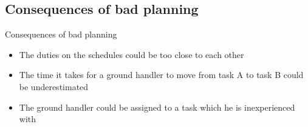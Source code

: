 \subsection{Consequences of bad planning}
\begin{frame}{Consequences of bad planning}{}
    \begin{itemize}
        \item The duties on the schedules could be too close to each other
        \item The time it takes for a ground handler to move from task A to task B could be underestimated
        \item The ground handler could be assigned to a task which he is inexperienced with
    \end{itemize}
\end{frame}
